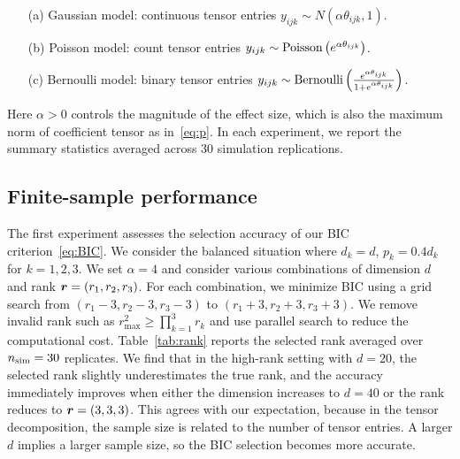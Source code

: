 \documentclass[12pt]{article}
\theoremstyle{definition}
\theoremstyle{definition}
\begin{document}
\begin{enumerate}[noitemsep,topsep=0pt]
\item[(a)] Gaussian model: continuous tensor entries $y_{ijk}\sim N\left(\alpha \theta_{ijk}, 1\right)$.
\item[(b)] Poisson model: count tensor entries $y_{ijk}\sim\textup{Poisson}\left(e^{\alpha \theta_{ijk}}\right)$.
\item[(c)] Bernoulli model: binary tensor entries $y_{ijk}\sim \textup{Bernoulli}\left( \frac{e^{\alpha \theta_{ijk}}}{1+e^{\alpha \theta_{ijk}}}\right)$.
\end{enumerate}
Here $\alpha>0$ controls the magnitude of the effect size, which is also the maximum norm of coefficient tensor as in~\eqref{eq:p}.
In each experiment, we report the summary statistics averaged across $30$ simulation replications. 

\subsection{Finite-sample performance}
The first experiment assesses the selection accuracy of our BIC criterion~\eqref{eq:BIC}. We consider the balanced situation where $d_k=d$, $p_k=0.4d_k$ for $k=1,2,3$. We set $\alpha=4$ and consider various combinations of dimension $d$ and rank $\bm{r}=(r_1,r_2,r_3)$. For each combination, we minimize BIC using a grid search from $(r_1-3,r_2-3,r_3-3)$ to $(r_1+3,r_2+3,r_3+3)$. We remove invalid rank such as $r^2_{\max} \geq \prod_{k=1}^3 r_k$ and use parallel search to reduce the computational cost. Table~\ref{tab:rank} reports the selected rank averaged over $n_{\textup{sim}}=30$ replicates. We find that in the high-rank setting with $d=20$, the selected rank slightly underestimates the true rank, and the accuracy immediately improves when either the dimension increases to $d = 40$ or the rank reduces to $\bm{r} = (3,3,3)$. This agrees with our expectation, because in the tensor decomposition, the sample size is related to the number of tensor entries. A larger $d$ implies a larger sample size, so the BIC selection becomes more accurate. 
\end{document}
